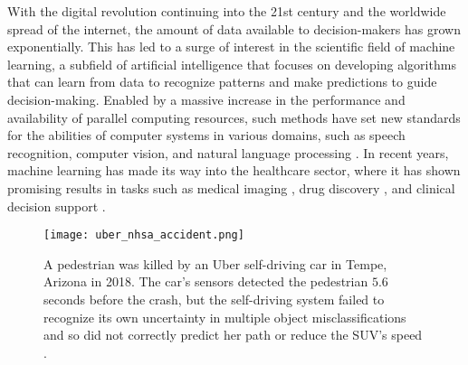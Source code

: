 With the digital revolution continuing into the 21st century and the worldwide spread of the internet, the amount of data available to decision-makers has grown exponentially. 
This has led to a surge of interest in the scientific field of machine learning, a subfield of artificial intelligence that focuses on developing algorithms that can learn from data to recognize patterns and make predictions to guide decision-making. 
Enabled by a massive increase in the performance and availability of parallel computing resources, such methods have set new standards for the abilities of computer systems in various domains, such as speech recognition, computer vision, and natural language processing \parencite{lecun_deep_2015}. 
In recent years, machine learning has made its way into the healthcare sector, where it has shown promising results in tasks such as medical imaging \parencite{lundervold_overview_2019}, drug discovery \parencite{chen_rise_2018}, and clinical decision support \parencite{cite15, cite14}. 

\begin{figure}
    \centering
    \texttt{[image: uber\_nhsa\_accident.png]}
    \caption[A pedestrian was killed by an Uber self-driving car in Tempe, Arizona in 2018.]{ A pedestrian was killed by an Uber self-driving car in Tempe, Arizona in 2018. The car's sensors detected the pedestrian $5.6$ seconds before the crash, but the self-driving system failed to recognize its own uncertainty in multiple object misclassifications and so did not correctly predict her path or reduce the SUV's speed \parencite[photo credit][]{nationaltransportationsafetyboardnhsa_collision_2019}.}
    \label{fig:uber_nhsa_accident}
\end{figure}

